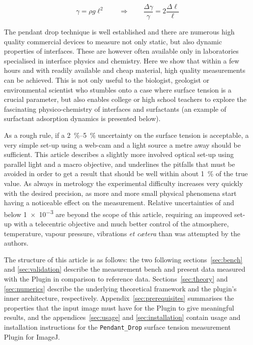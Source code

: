 \documentclass[fleqn]{scrartcl}
\newcommand{\gouttependante}{\texttt{Pendant\_Drop}\xspace}
\begin{document}
\[
\gamma = \rho g \ell^2 \qquad \Rightarrow \qquad
\frac{\Delta\gamma}{\gamma} = 2 \frac{\Delta\ell}{\ell}
\]

The pendant drop technique is well established and there are numerous
high quality commercial devices to measure not only static, but also
dynamic properties of interfaces. These are however often available
only in laboratories specialised in interface physics and chemistry.
Here we show that within a few hours and with readily available and
cheap material, high quality measurements can be achieved. This is not
only useful to the biologist, geologist or environmental scientist who
stumbles onto a case where surface tension is a crucial parameter, but
also enables college or high school teachers to explore the
fascinating physico-chemistry of interfaces and surfactants (an
example of surfactant adsorption dynamics is presented below).

As a rough rule, if a \SIrange{2}{5}{\percent} uncertainty on the
surface tension is acceptable, a very simple set-up using a web-cam
and a light source a metre away should be sufficient. This article
describes a slightly more involved optical set-up using parallel light
and a macro objective, and underlines the pitfalls that must be
avoided in order to get a result that should be well within about
\SI{1}{\percent} of the true value. As always in metrology the
experimental difficulty increases very quickly with the desired
precision, as more and more small physical phenomena start having a
noticeable effect on the measurement. Relative uncertainties of and
below \num{1e-3} are beyond the scope of this article, requiring an
improved set-up with a telecentric objective and much better control
of the atmosphere, temperature, vapour pressure, vibrations \textit{et
  c{\ae}tera} than was attempted by the authors.

The structure of this article is as follows: the two following
sections~\ref{sec:bench} and \ref{sec:validation} describe the
measurement bench and present data measured with the Plugin in
comparison to reference data. Sections~\ref{sec:theory} and
\ref{sec:numerics} describe the underlying theoretical framework and
the plugin's inner architecture, respectively.
Appendix~\ref{sec:prerequisites} summarises the properties that the
input image must have for the Plugin to give meaningful results, and
the appendices~\ref{sec:usage} and \ref{sec:installation} contain
usage and installation instructions for the \gouttependante surface
tension measurement Plugin for ImageJ.
\end{document}
